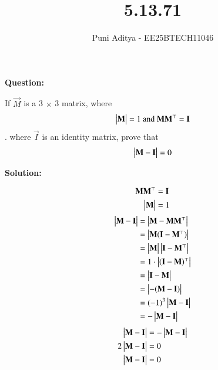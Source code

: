\documentclass[journal]{IEEEtran}
\begin{document}
\title{5.13.71}
\author{Puni Aditya - EE25BTECH11046}
\maketitle

\textbf{Question:}

If $\vec{M}$ is a 3 $\times$ 3 matrix, where 
\begin{align*}
    \begin{vmatrix}\mathbf{M}\end{vmatrix} = 1\text{ and }\mathbf{M}\mathbf{M}^\top = \mathbf{I}
\end{align*}. where $\vec{I}$ is an identity matrix, prove that 
\begin{align*}
    \begin{vmatrix}\mathbf{M} - \mathbf{I}\end{vmatrix} = 0
\end{align*}

\textbf{Solution:}

\begin{align*}
    \mathbf{M}\mathbf{M}^\top &= \mathbf{I} \\
    \begin{vmatrix}\mathbf{M}\end{vmatrix} &= 1
\end{align*}
\begin{align}
    \begin{vmatrix}\mathbf{M}-\mathbf{I}\end{vmatrix} &= \begin{vmatrix}\mathbf{M} - \mathbf{M}\mathbf{M}^\top\end{vmatrix} \\
    &= \begin{vmatrix}\mathbf{M}(\mathbf{I} - \mathbf{M}^\top)\end{vmatrix} \\
    &= \begin{vmatrix}\mathbf{M}\end{vmatrix}\begin{vmatrix}\mathbf{I} - \mathbf{M}^\top\end{vmatrix} \\
    &= 1 \cdot \begin{vmatrix}(\mathbf{I} - \mathbf{M})^\top\end{vmatrix} \\
    &= \begin{vmatrix}\mathbf{I} - \mathbf{M}\end{vmatrix} \\
    &= \begin{vmatrix}-(\mathbf{M} - \mathbf{I})\end{vmatrix} \\
    &= (-1)^3 \begin{vmatrix}\mathbf{M} - \mathbf{I}\end{vmatrix} \\
    &= -\begin{vmatrix}\mathbf{M} - \mathbf{I}\end{vmatrix}
\end{align}
\begin{align}
    \begin{vmatrix}\mathbf{M}-\mathbf{I}\end{vmatrix} &= -\begin{vmatrix}\mathbf{M}-\mathbf{I}\end{vmatrix} \\
    2\begin{vmatrix}\mathbf{M}-\mathbf{I}\end{vmatrix} &= 0 \\
    \begin{vmatrix}\mathbf{M}-\mathbf{I}\end{vmatrix} &= 0
\end{align}
\end{document}

